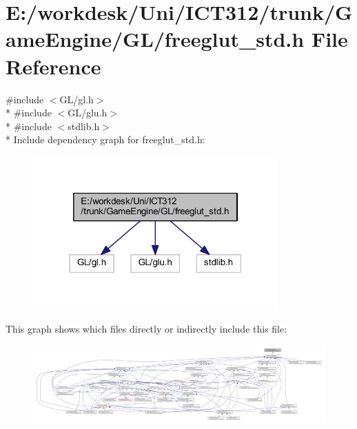 \section{E\+:/workdesk/\+Uni/\+I\+C\+T312/trunk/\+Game\+Engine/\+G\+L/freeglut\+\_\+std.h File Reference}
\label{freeglut__std_8h}
{\ttfamily \#include $<$G\+L/gl.\+h$>$}\\*
{\ttfamily \#include $<$G\+L/glu.\+h$>$}\\*
{\ttfamily \#include $<$stdlib.\+h$>$}\\*
Include dependency graph for freeglut\+\_\+std.\+h\+:\nopagebreak
\begin{figure}[H]
\begin{center}
\leavevmode
\includegraphics[width=266pt]{dd/de3/freeglut__std_8h__incl}
\end{center}
\end{figure}
This graph shows which files directly or indirectly include this file\+:
\nopagebreak
\begin{figure}[H]
\begin{center}
\leavevmode
\includegraphics[width=350pt]{d3/dba/freeglut__std_8h__dep__incl}
\end{center}
\end{figure}
